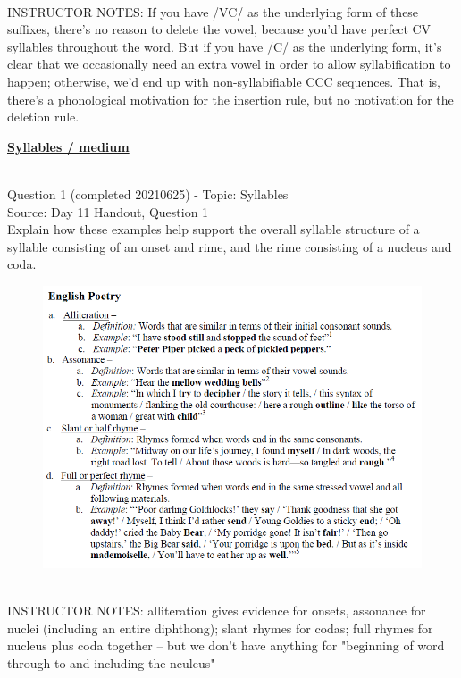 \documentclass[12pt]{article}
\begin{document}
~\\
INSTRUCTOR NOTES: If you have /VC/ as the underlying form of these suffixes, there’s no reason to delete the vowel, because you'd have perfect CV syllables throughout the word. But if you have /C/ as the underlying form, it’s clear that we occasionally need an extra vowel in order to allow syllabification to happen; otherwise, we’d end up with non-syllabifiable CCC sequences. That is, there’s a phonological motivation for the insertion rule, but no motivation for the deletion rule.


\newpage\textbf{\underline{\huge Syllables / medium\\}}

~\\

{\large Question 1} (completed 20210625) - Topic: Syllables\\
Source: Day 11 Handout, Question 1\\

Explain how these examples help support the overall syllable structure of a syllable consisting of an onset and rime, and the rime consisting of a nucleus and coda.\\

\begin{figure}[H]
\includegraphics{../images/english_poetry.png}
\end{figure}

~\\
INSTRUCTOR NOTES: alliteration gives evidence for onsets, assonance for nuclei (including an entire diphthong); slant rhymes for codas; full rhymes for nucleus plus coda together -- but we don't have anything for "beginning of word through to and including the nculeus"
\end{document}
